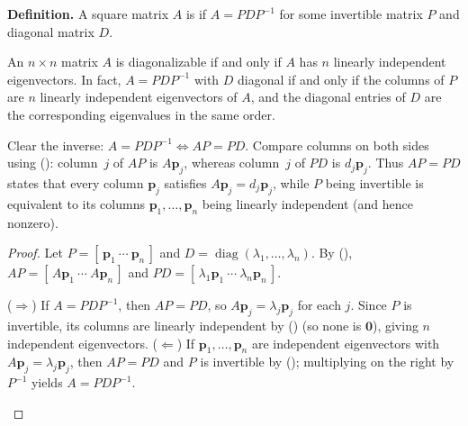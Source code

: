 \documentclass[10pt]{scrartcl}
\newcommand{\vv}[1]{\mathbf{#1}}
\begin{document}
\noindent\textbf{Definition.} A square matrix $A$ is  if $A=PDP^{-1}$ for some invertible matrix $P$ and diagonal matrix $D$.

\begin{theorem*}
  An $n\times n$ matrix $A$ is diagonalizable if and only if $A$ has $n$ linearly independent eigenvectors. In fact, $A=PDP^{-1}$ with $D$ diagonal if and only if the columns of $P$ are $n$ linearly independent eigenvectors of $A$, and the diagonal entries of $D$ are the corresponding eigenvalues in the same order.
\end{theorem*}
\begin{ideabox}
  Clear the inverse: $A=PDP^{-1} \iff AP=PD$. Compare columns on both sides using (): column~$j$ of $AP$ is $A\vv p_j$, whereas column~$j$ of $PD$ is $d_j\vv p_j$. Thus $AP=PD$ states that every column $\vv p_j$ satisfies $A\vv p_j=d_j\vv p_j$, while $P$ being invertible is equivalent to its columns $\vv p_1,\dots,\vv p_n$ being linearly independent (and hence nonzero).
\end{ideabox}
\begin{proof}
  Let $P=[\,\vv p_1\ \cdots\ \vv p_n\,]$ and $D=\operatorname{diag}(\lambda_1,\dots,\lambda_n)$. By (), $AP=[\,A\vv p_1\ \cdots\ A\vv p_n\,]$ and $PD=[\,\lambda_1\vv p_1\ \cdots\ \lambda_n\vv p_n\,]$.
  \begin{steps}
    \ii ($\Rightarrow$) If $A=PDP^{-1}$, then $AP=PD$, so $A\vv p_j=\lambda_j\vv p_j$ for each $j$. Since $P$ is invertible, its columns are linearly independent by () (so none is $\vv 0$), giving $n$ independent eigenvectors.
    \ii ($\Leftarrow$) If $\vv p_1,\dots,\vv p_n$ are independent eigenvectors with $A\vv p_j=\lambda_j\vv p_j$, then $AP=PD$ and $P$ is invertible by (); multiplying on the right by $P^{-1}$ yields $A=PDP^{-1}$.
  \end{steps}
\end{proof}
\end{document}
